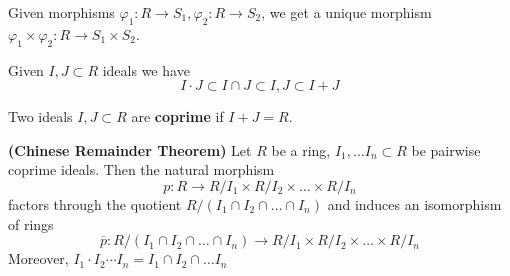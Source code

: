\begin{rmk}
    Given morphisms $\varphi_1:R \rightarrow S_1, \varphi_2:R \rightarrow S_2$, we
    get a unique morphism $\varphi_{1} \times \varphi_2: R \rightarrow S_1 \times S_2$.
\end{rmk}
\begin{rmk}
    Given $I,J \subset R$ ideals we have
    $$
    I \cdot J \subset I \cap J \subset I, J \subset I + J
    $$
\end{rmk}
\begin{defn}
    Two ideals $I,J \subset R$ are \textbf{coprime} if $I + J = R$.
\end{defn}
\begin{thm}
    \textbf{(Chinese Remainder Theorem)} Let $R$ be a ring, $I_1, \dots I_n \subset R$
    be pairwise coprime ideals. Then the natural morphism
    $$
    p: R \rightarrow R / I_1 \times R / I_2 \times \dots \times R / I_n
    $$
    factors through the quotient $R / (I_1 \cap I_2 \cap \dots \cap I_n)$ and induces
    an isomorphism of rings
    $$
    \overline{p}: R / (I_1 \cap I_2 \cap \dots \cap I_n) \rightarrow R / I_1 \times R / I_2 \times \dots \times R / I_n
    $$
    Moreover, $I_1 \cdot I_2 \cdots I_n = I_1 \cap I_2 \cap \dots I_n$
\end{thm}
